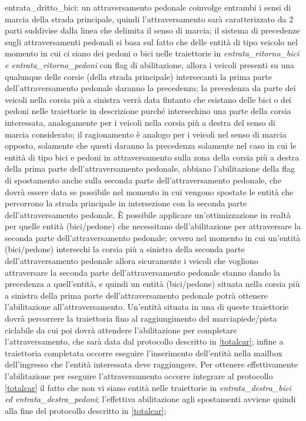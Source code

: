 \begin{enumerate}
\begin{enumerate}
\begin{itemize}
{en\-tra\-ta\_drit\-to\_bi\-ci}: un attraversamento pedonale coinvolge entrambi i sensi di marcia della strada principale, quindi l'attraversamento sarà caratterizzato da 2 parti suddivise dalla linea che delimita il senso di marcia; il sistema di precedenze sugli attraversamenti pedonali si basa sul fatto che delle entità di tipo veicolo nel momento in cui ci siano dei pedoni o bici nelle traiettorie in \textit{en\-tra\-ta\_ri\-tor\-no\_bi\-ci e en\-tra\-ta\_ri\-tor\-no\_pe\-do\-ni} con flag di abilitazione, allora i veicoli presenti su una qualunque delle corsie (della strada principale) intersecanti la prima parte dell'attraversamento pedonale daranno la precedenza; la precedenza da parte dei veicoli nella corsia più a sinistra verrà data fintanto che esistano delle bici o dei pedoni nelle traiettorie in descrizione purché intersechino una parte della corsia interessata, analogamente per i veicoli nella corsia più a destra del senso di marcia considerato; il ragionamento è analogo per i veicoli nel senso di marcia opposto, solamente che questi daranno la precedenza solamente nel caso in cui le entità di tipo bici e pedoni in attraversamento sulla zona della corsia più a destra della prima parte dell'attraversamento pedonale, abbiano l'abilitazione della flag di spostamento anche sulla seconda parte dell'attraversamento pedonale, che dovrà essere data se possibile nel momento in cui vengono spostate le entità che percorrono la strada principale in intersezione con la seconda parte dell'attraversamento pedonale. È possibile applicare un'ottimizzazione in realtà per quelle entità (bici/pedone) che necessitano dell'abilitazione per attraversare la seconda parte dell'attraversamento pedonale; ovvero nel momento in cui un'entità (bici/pedone) intersechi la corsia più a sinistra della seconda parte dell'attraversamento pedonale allora sicuramente i veicoli che vogliono attraversare la seconda parte dell'attraversamento pedonale stanno dando la precedenza a quell'entità, e quindi un entità (bici/pedone) situata nella corsia più a sinistra della prima parte dell'attraversamento pedonale potrà ottenere l'abilitazione all'attraversamento. Un'entità situata in una di queste traiettorie dovrà percorrere la traiettoria fino al raggiungimento del marciapiede/pista ciclabile da cui poi dovrà attendere l'abilitazione per completare l'attraversamento, che sarà data dal protocollo descritto in \ref{totalcar}; infine a traiettoria completata occorre eseguire l'inserimento dell'entità nella mailbox dell'ingresso che l'entità interessata deve raggiungere. Per ottenere effettivamente l'abilitazione per eseguire l'attraversamento occorre integrare al protocollo \ref{totalcar} il fatto che non vi siano entità nelle traiettorie in \textit{en\-tra\-ta\_des\-tra\_bi\-ci ed en\-tra\-ta\_des\-tra\_pe\-do\-ni}; l'effettiva abilitazione agli spostamenti avviene quindi alla fine del protocollo descritto in \ref{totalcar};

\end{itemize}
\end{enumerate}
\end{enumerate}
